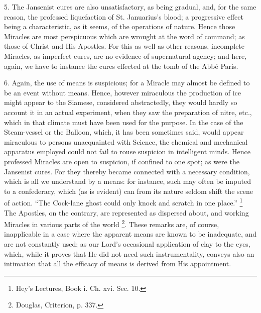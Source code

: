 5. The Jansenist cures are also unsatisfactory,
as being gradual, and, for the same reason, the professed liquefaction
of St. Januarius's blood; a progressive effect being a characteristic,
as it seems, of the operations of nature. Hence those Miracles are
most perspicuous which are wrought at the word of command; as those of
Christ and His Apostles. For this as well as other reasons, incomplete
Miracles, as imperfect cures, are no evidence of supernatural
agency; and here, again, we have to instance the cures effected at the
tomb of the Abbé Paris.

6. Again, the use of means is suspicious; for a
Miracle may almost be defined to be an event without means. Hence,
however miraculous the production of ice might appear to the Siamese,
considered abstractedly, they would hardly so account it in an actual
experiment, when they saw the preparation of nitre, etc., which in
that climate must have been used for the purpose. In the case of the
Steam-vessel or the Balloon, which, it has been sometimes said, would
appear miraculous to persons unacquainted with Science, the chemical
and mechanical apparatus employed could not fail to rouse suspicion in
intelligent minds. Hence professed Miracles are open to suspicion, if
confined to one spot; as were the Jansenist cures. For they thereby
became connected with a necessary condition, which is all we
understand by a means: for instance, such may often be imputed to a
confederacy, which (as is evident) can from its nature seldom shift
the scene of action. ``The Cock-lane ghost could only knock and scratch
in one place.'' \footnote{Hey's Lectures, Book i. Ch. xvi. Sec. 10.} The
Apostles, on the contrary, are represented as dispersed about, and
working Miracles in various parts of the world \footnote{Douglas, Criterion, p. 337.}. These remarks are, of course, inapplicable in a case
where the apparent means are known to be inadequate, and are not
constantly used; as our Lord's occasional application of clay to the
eyes, which, while it proves that He did not need such
instrumentality, conveys also an intimation that all the efficacy of
means is derived from His appointment.


